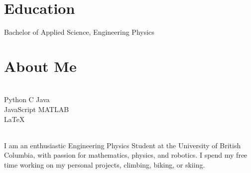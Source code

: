 \documentclass[]{deedy-resume-openfont}
\begin{document}
	\section{Education}
	\begin{tightemize}
		\item Bachelor of Applied Science, Engineering Physics \\
	\end{tightemize}
	\vspace{8pt}
	
	\section{About Me}
	\begin{minipage}[t]{.35\textwidth}
		 \\
		Python \textbullet{} C \textbullet{} Java \\
		JavaScript \textbullet{} MATLAB \\
		\LaTeX
		\vspace{8pt}
	\end{minipage}
	\hfill
	\begin{minipage}[t]{.55\textwidth}
		 \\
		I am an enthusiastic Engineering Physics Student at the University of British Columbia, with passion for mathematics, physics, and robotics. I spend my free time working on my personal projects, climbing, biking, or skiing.
	\end{minipage}
	
\end{document}
